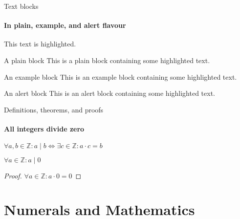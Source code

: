 \documentclass{ELSAbeamer}
\begin{document}
\begin{frame}{Text blocks}
\framesubtitle{In plain, example, and \alert{alert} flavour}
\alert{This text} is highlighted.

\begin{block}{A plain block}
    This is a plain block containing some \alert{highlighted text}.
\end{block}

\begin{exampleblock}{An example block}
    This is an example block containing some \alert{highlighted text}.
\end{exampleblock}

\begin{alertblock}{An alert block}
    This is an alert block containing some \alert{highlighted text}.
\end{alertblock}
\end{frame}

 \begin{frame}[label=proof]{Definitions, theorems, and proofs}
\framesubtitle{All integers divide zero}
\begin{definition}
    $\forall a,b\in\mathbb{Z}: a\mid b\iff\exists c\in\mathbb{Z}:a\cdot c=b$
\end{definition}

\begin{theorem}
    $\forall a\in\mathbb{Z}: a\mid 0$
\end{theorem}

\begin{proof}
    $\forall a\in\mathbb{Z}: a\cdot 0=0$
\end{proof}
\end{frame}

\section{Numerals and Mathematics}
\end{document}
